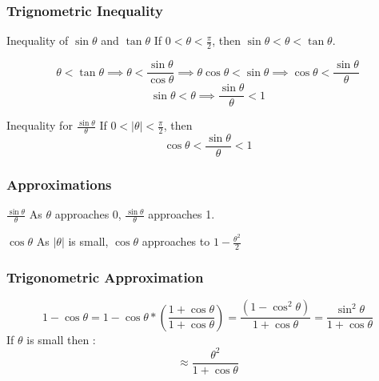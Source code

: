     \begin{frame}
    \frametitle{Trignometric Inequality}
    \begin{block}{Inequality of \(\sin \theta\) and \(\tan \theta\)}
        If \( 0 < \theta < \frac{\pi}{2} \), then \(\sin \theta < \theta < \tan \theta \).
    \end{block}
    \begin{displaymath}
        \theta < \tan \theta \implies \theta < \frac{\sin \theta}{\cos \theta} \implies \theta \cos \theta < \sin \theta \implies \cos \theta < \frac{\sin \theta}{\theta}
    \end{displaymath}
    \begin{displaymath}
        \sin \theta < \theta \implies \frac{\sin \theta}{\theta} < 1
    \end{displaymath}
    \begin{block}{Inequality for \( \frac{\sin \theta}{\theta} \)}
        If \( 0 < |\theta| < \frac{\pi}{2} \), then
        \[ \cos \theta <  \frac{\sin \theta}{\theta} < 1 \]
    \end{block}
    \end{frame}

    \begin{frame}
        \frametitle{Approximations}
        \begin{block}{\( \frac{\sin \theta}{\theta} \)}
            As \( \theta \) approaches 0, \( \frac{\sin \theta}{\theta} \) approaches 1.
        \end{block}
        \begin{block}{\(  \cos \theta \)}
            As \( |\theta| \) is small, \( \cos \theta \) approaches to  \(1 - \frac{\theta^2}{2} \)
        \end{block}
    \end{frame} 

    \begin{frame}
    \frametitle{Trigonometric Approximation}
    \begin{displaymath}
        1 - \cos \theta = 1 - \cos \theta * (\frac{1 + \cos \theta}{1 + \cos \theta}) = \frac{(1 - \cos^2 \theta)}{1 + \cos \theta} = \frac{\sin^2 \theta}{1 + \cos \theta}
    \end{displaymath}
    If \( \theta\) is small then :
    \begin{displaymath}
      \approx  \frac{\theta ^{2}}{1+ \cos \theta}
    \end{displaymath}
    \end{frame}

